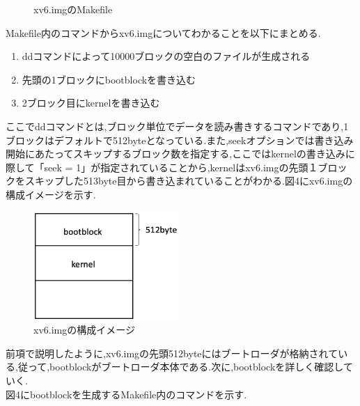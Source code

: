 \documentclass[submit,techreq,noauthor]{eco}	%
\begin{document}
\begin{figure}[H]
    \centering
    \caption{xv6.imgのMakefile}
\end{figure}

Makefile内のコマンドからxv6.imgについてわかることを以下にまとめる.

\begin{enumerate}
\renewcommand{\labelenumi}{\arabic{enumi}).}
\item ddコマンドによって10000ブロックの空白のファイルが生成される
\item 先頭の1ブロックにbootblockを書き込む
\item 2ブロック目にkernelを書き込む
\end{enumerate}

ここでddコマンドとは,ブロック単位でデータを読み書きするコマンドであり,1ブロックはデフォルトで512byteとなっている.また,seekオプションでは書き込み開始にあたってスキップするブロック数を指定する,ここではkernelの書き込みに際して「seek = 1」が指定されていることから,kernelはxv6.imgの先頭１ブロックをスキップした513byte目から書き込まれていることがわかる.図4にxv6.imgの構成イメージを示す.

\begin{figure}[H]
    \centering
    \includegraphics[width=5.5cm]{fig/pic3.eps}
    \caption{xv6.imgの構成イメージ}
    \label{sample}
\end{figure}

前項で説明したように,xv6.imgの先頭512byteにはブートローダが格納されている,従って,bootblockがブートローダ本体である.次に,bootblockを詳しく確認していく.\\
\indent 図4にbootblockを生成するMakefile内のコマンドを示す.
\end{document}
